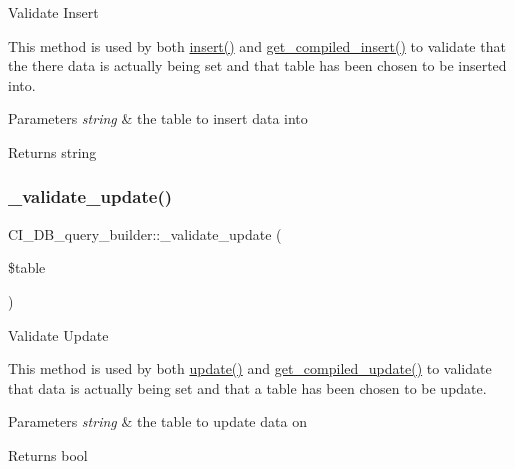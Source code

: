 Validate Insert

This method is used by both \mbox{\hyperlink{class_c_i___d_b__query__builder_a499da3fcfbfb23fda9e78c152f4fd3f4}{insert()}} and \mbox{\hyperlink{class_c_i___d_b__query__builder_af6312c5cd6fc7434ccf0059281fcc490}{get\+\_\+compiled\+\_\+insert()}} to validate that the there data is actually being set and that table has been chosen to be inserted into.


\begin{DoxyParams}{Parameters}
{\em string} & the table to insert data into \\
\hline
\end{DoxyParams}
\begin{DoxyReturn}{Returns}
string 
\end{DoxyReturn}
\mbox{\label{class_c_i___d_b__query__builder_a25f878a242d0b34bd1ed1b83431714af}} 
\subsubsection{\texorpdfstring{\+\_\+validate\+\_\+update()}{\_validate\_update()}}
{\footnotesize\ttfamily C\+I\+\_\+\+D\+B\+\_\+query\+\_\+builder\+::\+\_\+validate\+\_\+update (\begin{DoxyParamCaption}\item[{}]{\$table }\end{DoxyParamCaption})\hspace{0.3cm}{\ttfamily [protected]}}

Validate Update

This method is used by both \mbox{\hyperlink{class_c_i___d_b__query__builder_a396216c9f58d8b98ae09faf00f0203f1}{update()}} and \mbox{\hyperlink{class_c_i___d_b__query__builder_a6fa661dc20fa2a32413aef4d38c198aa}{get\+\_\+compiled\+\_\+update()}} to validate that data is actually being set and that a table has been chosen to be update.


\begin{DoxyParams}{Parameters}
{\em string} & the table to update data on \\
\hline
\end{DoxyParams}
\begin{DoxyReturn}{Returns}
bool 
\end{DoxyReturn}
\mbox{\label{class_c_i___d_b__query__builder_ae7da7cfc4e206d9f962326ed3e0a55a5}} 
